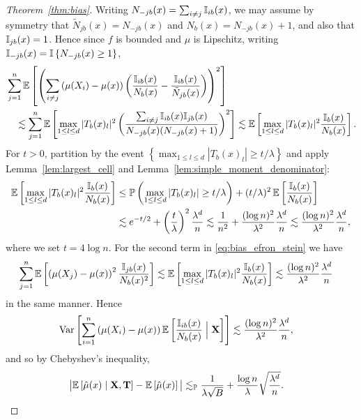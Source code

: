 \begin{proof}[Theorem~\ref{thm:bias}]
  Writing $N_{-j b}(x) = \sum_{i \neq j} \mathbb{I}_{i b}(x)$,
  we may assume by symmetry that
  $\tilde N_{j b}(x) = N_{-j b}(x)$ and $N_b(x) = N_{-j b}(x) + 1$,
  and also that $\mathbb{I}_{j b}(x) = 1$.
  Hence since $f$ is bounded and $\mu$ is Lipschitz,
  writing $\mathbb{I}_{-j b}(x) = \mathbb{I} \left\{ N_{-j b}(x) \geq 1 \right\}$,
  \begin{align*}
    &\sum_{j=1}^{n}
    \mathbb{E} \left[
      \left(
        \sum_{i \neq j}
        \left( \mu(X_i) - \mu(x) \right)
        \left(
          \frac{\mathbb{I}_{i b}(x)}{N_b(x)} - \frac{\mathbb{I}_{i b}(x)}{\tilde N_{j b}(x)}
        \right)
      \right)^2
    \right] \\
    &\quad\lesssim
    \sum_{j=1}^{n}
    \mathbb{E} \left[
      \max_{1 \leq l \leq d}
      |T_b(x)_l|^2
      \left(
        \frac{\sum_{i \neq j}\mathbb{I}_{i b}(x) \mathbb{I}_{j b}(x)}
        {N_{-j b}(x)(N_{-j b}(x) + 1)}
      \right)^2
    \right]
    \lesssim
    \mathbb{E} \left[
      \max_{1 \leq l \leq d}
      |T_b(x)_l|^2
      \frac{\mathbb{I}_{b}(x)}{N_{b}(x)}
    \right].
  \end{align*}
  For $t > 0$, partition by the event
  $\left\{ \max_{1 \leq l \leq d} |T_b(x)_l| \geq t/\lambda \right\}$
  and apply Lemma~\ref{lem:largest_cell} and
  Lemma~\ref{lem:simple_moment_denominator}:
  \begin{align*}
    \mathbb{E} \left[
      \max_{1 \leq l \leq d}
      |T_b(x)_l|^2
      \frac{\mathbb{I}_{b}(x)}{N_{b}(x)}
    \right]
    &\leq
    \mathbb{P} \left(
      \max_{1 \leq l \leq d} |T_b(x)_l| \geq t/\lambda
    \right)
    + (t / \lambda)^2\,
    \mathbb{E} \left[
      \frac{\mathbb{I}_{b}(x)}{N_{b}(x)}
    \right] \\
    &\lesssim
    e^{-t/2}
    + \left( \frac{t}{\lambda} \right)^2
    \frac{\lambda^d}{n}
    \lesssim
    \frac{1}{n^2}
    + \frac{(\log n)^2}{\lambda^2}
    \frac{\lambda^d}{n}
    \lesssim
    \frac{(\log n)^2}{\lambda^2}
    \frac{\lambda^{d}}{n},
  \end{align*}
  where we set $t = 4 \log n$.
  For the second term in \eqref{eq:bias_efron_stein} we have
  \begin{align*}
    \sum_{j=1}^{n}
    \mathbb{E} \left[
      \left( \mu(X_j) - \mu(x) \right)^2
      \frac{\mathbb{I}_{j b}(x)}{N_b(x)^2}
    \right]
    &\lesssim
    \mathbb{E} \left[
      \max_{1 \leq l \leq d}
      |T_b(x)_l|^{2}
      \frac{\mathbb{I}_{b}(x)}{N_b(x)}
    \right]
    \lesssim
    \frac{(\log n)^2}{\lambda^2}
    \frac{\lambda^{d}}{n}
  \end{align*}
  in the same manner.
  Hence
  \begin{align*}
    \operatorname{Var} \left[
      \sum_{i=1}^{n}
      \left( \mu(X_i) - \mu(x) \right)
      \mathbb{E} \left[
        \frac{\mathbb{I}_{i b}(x)}{N_b(x)}
        \Bigm| \mathbf{X}
      \right]
    \right]
    &\lesssim
    \frac{(\log n)^2}{\lambda^2}
    \frac{\lambda^{d}}{n},
  \end{align*}
  and so by Chebyshev's inequality,
  \begin{align*}
    \big|
    \mathbb{E} \left[ \hat \mu(x) \mid \mathbf{X}, \mathbf{T} \right]
    - \mathbb{E} \left[ \hat \mu(x) \right]
    \big|
    &\lesssim_{\mathbb{P}}
    \frac{1}{\lambda \sqrt B}
    + \frac{\log n}{\lambda}
    \sqrt{ \frac{\lambda^{d}}{n} }.
  \end{align*}


\end{proof}
